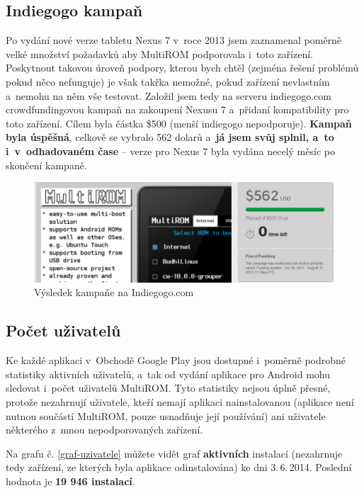\documentclass[12pt, a4paper, oneside]{article}
\newcommand{\B}{\textbf} %
\begin{document}
\subsection{Indiegogo kampaň}
Po vydání nové verze tabletu Nexus 7 v~roce 2013 jsem zaznamenal poměrně velké množství požadavků aby MultiROM podporovala i~toto zařízení. Poskytnout takovou úroveň podpory, kterou bych chtěl (zejména řešení problémů pokud něco nefunguje) je však takřka nemožné, pokud zařízení nevlastním a~nemohu na něm vše testovat. Založil jsem tedy na serveru indiegogo.com\cite{indiegogo} crowdfundingovou kampaň na zakoupení Nexusu 7 a~přidaní kompatibility pro toto zařízení\cite{indiegogo-multirom}. Cílem byla částka \$500 (menší indiegogo nepodporuje). \B{Kampaň byla úspěšná}, celkově se vybralo 562 dolarů a~\B{já jsem svůj  splnil, a~to i~v~odhadovaném čase} -- verze pro Nexus 7 byla vydána necelý měsíc po skončení kampaně.

\begin{figure}[H]
\begin{center}
 \includegraphics[width=\textwidth]{../img/indiegogo.png}
\caption{Výsledek kampaňe na Indiegogo.com}
\end{center}
\end{figure}

\vspace{-13.5mm}
\subsection{Počet uživatelů}
Ke každé aplikaci v~Obchodě Google Play jsou dostupné i~poměrně podrobné statistiky aktivních uživatelů, a~tak od vydání aplikace pro Android mohu sledovat i~počet uživatelů MultiROM. Tyto statistiky nejsou úplně přesné, protože nezahrnují uživatele, kteří nemají aplikaci nainstalovanou (aplikace není nutnou součástí MultiROM, pouze usnadňuje její používání) ani uživatele některého z~mnou nepodporovaných zařízení.

Na grafu č. \ref{graf-uzivatele} můžete vidět graf \B{aktivních} instalací (nezahrnuje tedy zařízení, ze kterých byla aplikace odinstalována) ke dni 3.\,6.\,2014. Poslední hodnota je \B{19 946 instalací}.
\end{document}
